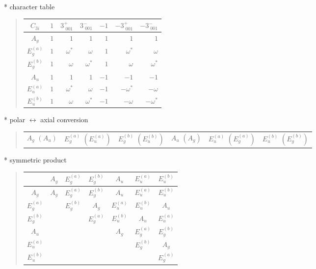 \documentclass[fleqn,10pt,landscape]{jsarticle}
\begin{document}
* character table
\begin{quote}
\begin{tabular}{crrrrrr} \hline \hline
$ C_{3i} $ & $ 1 $ & $ 3^{+}_{\,\,001} $ & $ 3^{-}_{\,\,001} $ & $ -1 $ & $ -3^{+}_{\,\,001} $ & $ -3^{-}_{\,\,001} $ \\ \hline
$ A_{g} $ & $ 1 $ & $ 1 $ & $ 1 $ & $ 1 $ & $ 1 $ & $ 1 $ \\
$ E_{g}^{(a)} $ & $ 1 $ & $ \omega^{*} $ & $ \omega $ & $ 1 $ & $ \omega^{*} $ & $ \omega $ \\
$ E_{g}^{(b)} $ & $ 1 $ & $ \omega $ & $ \omega^{*} $ & $ 1 $ & $ \omega $ & $ \omega^{*} $ \\
$ A_{u} $ & $ 1 $ & $ 1 $ & $ 1 $ & $ -1 $ & $ -1 $ & $ -1 $ \\
$ E_{u}^{(a)} $ & $ 1 $ & $ \omega^{*} $ & $ \omega $ & $ -1 $ & $ - \omega^{*} $ & $ - \omega $ \\
$ E_{u}^{(b)} $ & $ 1 $ & $ \omega $ & $ \omega^{*} $ & $ -1 $ & $ - \omega $ & $ - \omega^{*} $ \\
 \hline \hline
\end{tabular}
\end{quote}
* polar $\leftrightarrow$ axial conversion
\begin{quote}
\begin{tabular}{cccccc}
$ A_{g}\,\,(A_{u}) $ & $ E_{g}^{(a)}\,\,(E_{u}^{(a)}) $ & $ E_{g}^{(b)}\,\,(E_{u}^{(b)}) $ & $ A_{u}\,\,(A_{g}) $ & $ E_{u}^{(a)}\,\,(E_{g}^{(a)}) $ & $ E_{u}^{(b)}\,\,(E_{g}^{(b)}) $
\end{tabular}
\end{quote}
* symmetric product
\begin{quote}
\begin{tabular}{c|cccccc} \hline \hline
 & $ A_{g} $ & $ E_{g}^{(a)} $ & $ E_{g}^{(b)} $ & $ A_{u} $ & $ E_{u}^{(a)} $ & $ E_{u}^{(b)} $ \\ \hline
$ A_{g} $ & $ A_{g} $ & $ E_{g}^{(a)} $ & $ E_{g}^{(b)} $ & $ A_{u} $ & $ E_{u}^{(a)} $ & $ E_{u}^{(b)} $ \\
$ E_{g}^{(a)} $ & $  $ & $ E_{g}^{(b)} $ & $ A_{g} $ & $ E_{u}^{(a)} $ & $ E_{u}^{(b)} $ & $ A_{u} $ \\
$ E_{g}^{(b)} $ & $  $ & $  $ & $ E_{g}^{(a)} $ & $ E_{u}^{(b)} $ & $ A_{u} $ & $ E_{u}^{(a)} $ \\
$ A_{u} $ & $  $ & $  $ & $  $ & $ A_{g} $ & $ E_{g}^{(a)} $ & $ E_{g}^{(b)} $ \\
$ E_{u}^{(a)} $ & $  $ & $  $ & $  $ & $  $ & $ E_{g}^{(b)} $ & $ A_{g} $ \\
$ E_{u}^{(b)} $ & $  $ & $  $ & $  $ & $  $ & $  $ & $ E_{g}^{(a)} $ \\
 \hline \hline
\end{tabular}
\end{quote}
\end{document}
